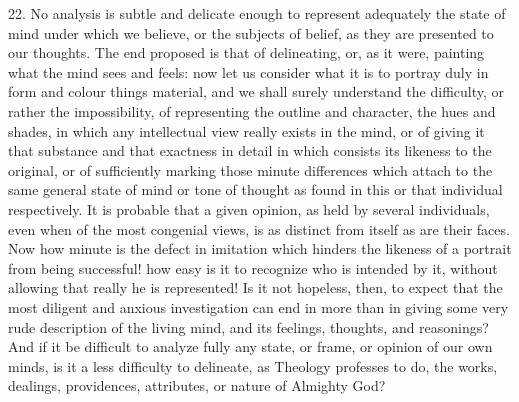 22. No analysis is subtle and delicate enough to represent
adequately the state of mind under which we believe, or the subjects
of belief, as they are presented to our thoughts. The end proposed is
that of delineating, or, as it were, painting what the mind sees and
feels: now let us consider what it is to portray duly in form and
colour things material, and we shall surely understand the difficulty,
or rather the impossibility, of representing the outline and
character, the hues and shades, in which any intellectual view really
exists in the mind, or of giving it that substance and that exactness
in detail in which consists its likeness to the original, or of
sufficiently marking those minute differences which attach to the same
general state of mind or tone of thought as found in this or that
individual respectively. It is probable that a given opinion, as held
by several individuals, even when of the most congenial views, is as
distinct from itself as are their faces. Now how minute is the defect
in imitation which hinders the likeness of a portrait from being
successful! how easy is it to recognize who is intended by it, without
allowing that really he is represented! Is it not hopeless, then, to
expect that the most diligent and anxious investigation can end in
more than in giving some very rude description of the living mind, and
its feelings, thoughts, and reasonings? And if it be difficult to
analyze fully any state, or frame, or opinion of our own minds, is it
a less difficulty to delineate, as Theology professes to do, the
works, dealings, providences, attributes, or nature of Almighty God?

